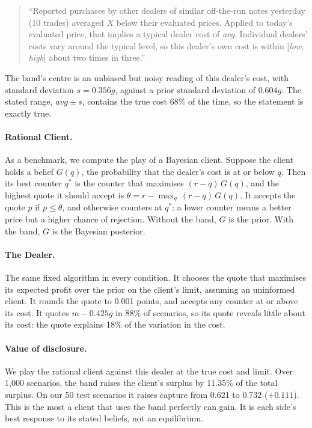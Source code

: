 \documentclass[sigconf]{acmart}
\begin{document}
\begin{quote}
``Reported purchases by other dealers of similar off-the-run notes yesterday (10 trades) averaged $X$ below their evaluated prices. Applied to today's evaluated price, that implies a typical dealer cost of \textit{avg}. Individual dealers' costs vary around the typical level, so this dealer's own cost is within [\textit{low}, \textit{high}] about two times in three.''
\end{quote}

The band's centre is an unbiased but noisy reading of this dealer's cost, with standard deviation $s = 0.356g$, against a prior standard deviation of $0.604g$. The stated range, $\textit{avg} \pm s$, contains the true cost 68\% of the time, so the statement is exactly true.

\paragraph{Rational Client.}
As a benchmark, we compute the play of a Bayesian client. Suppose the client holds a belief $G(q)$, the probability that the dealer's cost is at or below $q$. Then its best counter $q^*$ is the counter that maximises $(r - q)\,G(q)$, and the highest quote it should accept is $\theta = r - \max_q\,(r - q)\,G(q)$. It accepts the quote $p$ if $p \le \theta$, and otherwise counters at $q^*$: a lower counter means a better price but a higher chance of rejection. Without the band, $G$ is the prior. With the band, $G$ is the Bayesian posterior.

\paragraph{The Dealer.}
The same fixed algorithm in every condition. It chooses the quote that maximises its expected profit over the prior on the client's limit, assuming an uninformed client. It rounds the quote to 0.001 points, and accepts any counter at or above its cost. It quotes $m - 0.425g$ in 88\% of scenarios, so its quote reveals little about its cost: the quote explains 18\% of the variation in the cost.

\paragraph{Value of disclosure.}
We play the rational client against this dealer at the true cost and limit. Over 1{,}000 scenarios, the band raises the client's surplus by 11.35\% of the total surplus. On our 50 test scenarios it raises capture from 0.621 to 0.732 ($+0.111$). This is the most a client that uses the band perfectly can gain. It is each side's best response to its stated beliefs, not an equilibrium.
\end{document}
